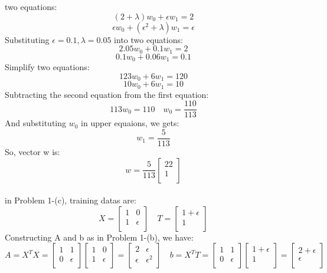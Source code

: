 \documentclass{article}
\begin{document}
two equations:
\[
    (2+\lambda)w_{0} + \epsilon w_{1} = 2
\]
\[
    \epsilon w_{0} + (\epsilon^{2}+\lambda) w_{1} = \epsilon
\]
Substituting $\epsilon = 0.1, \lambda = 0.05$ into two equations:
\[
    2.05w_{0} + 0.1w_{1} = 2
\]
\[
    0.1w_{0} + 0.06w_{1} = 0.1
\]
Simplify two equations:
\[
    123w_{0} + 6w_{1} = 120
\]
\[
    10w_{0} + 6w_{1} = 10
\]
Subtracting the second equation from the first equation:
\[
    113w_{0} = 110
    \hspace{1em}
    w_{0} = \frac{110}{113}
\]
And substituting $w_{0}$ in upper equaions, we gets:
\[
    w_{1}=\frac{5}{113}
\]
So, vector w is:
\[
    w = \frac{5}{113}
    \begin{bmatrix}
        22 \\
        1 \\
    \end{bmatrix}
\]
\\
in Problem 1-(c), training datas are:
\[
X=\begin{bmatrix}
    1 & 0 \\
    1 & \epsilon \\
\end{bmatrix}
\hspace{1em}
T=\begin{bmatrix}
    1 + \epsilon \\
    1 \\
\end{bmatrix}
\]
Constructing A and b as in Problem 1-(b), we have:
\[
A = X^{T}X=\begin{bmatrix}
    1 & 1 \\
    0 & \epsilon \\
\end{bmatrix}
\begin{bmatrix}
    1 & 0 \\
    1 & \epsilon \\
\end{bmatrix}
=
\begin{bmatrix}
    2 & \epsilon \\
    \epsilon & \epsilon^{2} \\
\end{bmatrix}
\hspace{1em}
b = X^{T}T=
\begin{bmatrix}
    1 & 1\\
    0 & \epsilon \\
\end{bmatrix}
\begin{bmatrix}
    1 + \epsilon\\
    1 \\
\end{bmatrix}
=
\begin{bmatrix}
    2 + \epsilon\\
    \epsilon \\
\end{bmatrix}
\]
\end{document}
